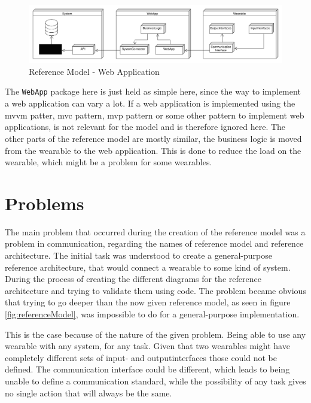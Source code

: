 \begin{figure}[htbp]
	\includegraphics[width=\linewidth]{images/PackageModel_ReferenceArchitecture_WebApp}
	\caption{Reference Model - Web Application}
	\label{fig:referenceModel_WebApp}
\end{figure}

The \texttt{WebApp} package here is just held as simple here, since the way to implement a web application can vary a lot. If a web application is implemented using the \gls{mvvm} patter, \gls{mvc} pattern, \gls{mvp} pattern or some other pattern to implement web applications, is not relevant for the model and is therefore ignored here. The other parts of the reference model are mostly similar, the business logic is moved from the wearable to the web application. This is done to reduce the load on the wearable, which might be a problem for some wearables.

\clearpage
\section{Problems}
The main problem that occurred during the creation of the \gls{reference model} was a problem in communication, regarding the names of \gls{reference model} and \gls{reference architecture}. The initial task was understood to create a general-purpose \gls{reference architecture}, that would connect a \gls{wearable} to some kind of system. During the process of creating the different diagrams for the reference architecture and trying to validate them using code. The problem became obvious that trying to go deeper than the now given \gls{reference model}, as seen in figure \ref{fig:referenceModel}, was impossible to do for a general-purpose implementation.

This is the case because of the nature of the given problem. Being able to use any wearable with any system, for any task. Given that two wearables might have completely different sets of input- and outputinterfaces those could not be defined. The communication interface could be different, which leads to being unable to define a communication standard, while the possibility of any task gives no single action that will always be the same.